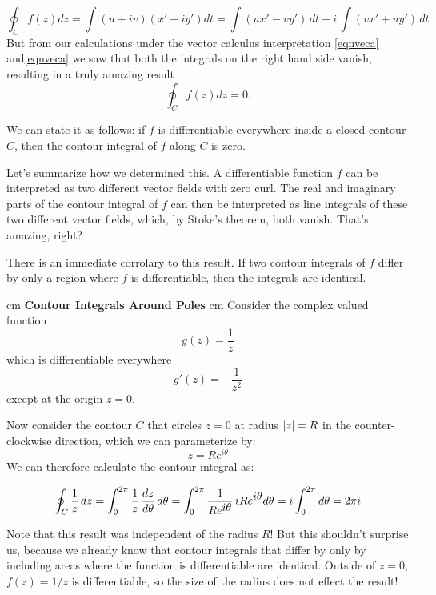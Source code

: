 \documentclass[12pt]{article}
\begin{document}
\begin{displaymath}
\oint_C f(z) dz = \int (u+iv)(x'+iy')dt = \int(ux'-vy')\,dt + i\,\int(vx'+uy')\,dt
\end{displaymath}
But from our calculations under the vector calculus interpretation
\eqref{eqnveca} and\eqref{eqnveca} we saw that both the integrals on the right hand side vanish, resulting in a truly amazing result 
\begin{equation}
\oint_C f(z) dz = 0.
\end{equation}

We can state it as follows:  if $f$ is differentiable everywhere inside a closed contour $C$, then the contour integral of $f$ along $C$ is zero.

Let's summarize how we determined this.  A differentiable function $f$ can be
interpreted as two different vector fields with zero curl.  The real and
imaginary parts of the contour integral of $f$ can then be interpreted as line
integrals of these two different vector fields, which, by Stoke's theorem, both
vanish.  That's amazing, right?

There is an immediate corrolary to this result.  If two contour integrals of $f$
differ by only a region where $f$ is differentiable, then the integrals are
identical.

 cm
\noindent
{\bf Contour Integrals Around Poles}
 cm
\noindent
Consider the complex valued function
\begin{equation}
g(z) = \frac{1}{z}
\end{equation}
which is differentiable everywhere
\begin{equation}
g'(z) = -\frac{1}{z^2}
\end{equation}
except at the origin $z=0$.

Now consider the contour $C$ that circles $z=0$ at radius $\left| z \right| = R$ in the
counter-clockwise direction, which we can parameterize by:
\begin{displaymath}
z = Re^{\textstyle i \theta}
\end{displaymath}
We can therefore calculate the contour integral as:

\begin{displaymath}
\oint_C \frac{1}{z}\,dz = \int_0^{2\pi} \frac{1}{z}\,\frac{d z}{d \theta}\,d\theta
= \int_0^{2\pi} \frac{1}{Re^{\textstyle i\theta}}\,iRe^{\textstyle i\theta}
 d\theta = i \int_0^{2\pi}d\theta = 2 \pi i 
\end{displaymath}

Note that this result was independent of the radius $R$!  But this shouldn't surprise us, because we already know that contour integrals that differ by only by including areas where the function is differentiable are identical.  Outside of $z=0$, $f(z)=1/z$ is differentiable, so the size of the radius does not effect the result!
\end{document}
